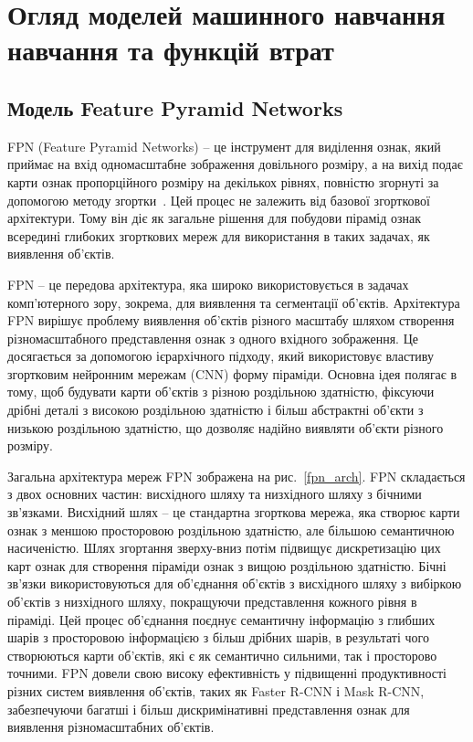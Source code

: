 \chapter{Огляд моделей машинного навчання навчання та функцій втрат}
\label{chap:theory}

\section{Модель Feature Pyramid Networks}

FPN (Feature Pyramid Networks) -- це інструмент для виділення ознак, який
приймає на вхід одномасштабне зображення довільного розміру, а на вихід подає
карти ознак пропорційного розміру на декількох рівнях, повністю згорнуті за
допомогою методу згортки~\cite{lin2016}. Цей процес не залежить від базової
згорткової архітектури. Тому він діє як загальне рішення для побудови пірамід
ознак всередині глибоких згорткових мереж для використання в таких задачах, як
виявлення об'єктів.

FPN -- це передова архітектура, яка широко використовується в задачах
комп'ютерного зору, зокрема, для виявлення та сегментації об'єктів. Архітектура
FPN вирішує проблему виявлення об'єктів різного масштабу шляхом створення
різномасштабного представлення ознак з одного вхідного зображення. Це
досягається за допомогою ієрархічного підходу, який використовує властиву
згортковим нейронним мережам (CNN) форму піраміди. Основна ідея полягає в тому,
щоб будувати карти об'єктів з різною роздільною здатністю, фіксуючи дрібні
деталі з високою роздільною здатністю і більш абстрактні об'єкти з низькою
роздільною здатністю, що дозволяє надійно виявляти об'єкти різного розміру.

Загальна архітектура мереж FPN зображена на рис.~\ref{fpn_arch}. FPN складається з двох основних частин: висхідного шляху та низхідного шляху з
бічними зв'язками. Висхідний шлях -- це стандартна згорткова мережа, яка
створює карти ознак з меншою просторовою роздільною здатністю, але більшою
семантичною насиченістю. Шлях згортання зверху-вниз потім підвищує
дискретизацію цих карт ознак для створення піраміди ознак з вищою роздільною
здатністю. Бічні зв'язки використовуються для об'єднання об'єктів з висхідного
шляху з вибіркою об'єктів з низхідного шляху, покращуючи представлення кожного
рівня в піраміді. Цей процес об'єднання поєднує семантичну інформацію з глибших
шарів з просторовою інформацією з більш дрібних шарів, в результаті чого
створюються карти об'єктів, які є як семантично сильними, так і просторово
точними. FPN довели свою високу ефективність у підвищенні продуктивності різних
систем виявлення об'єктів, таких як Faster R-CNN і Mask R-CNN, забезпечуючи
багатші і більш дискримінативні представлення ознак для виявлення
різномасштабних об'єктів.


